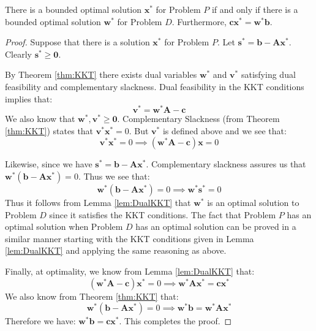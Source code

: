 \begin{lemma} There is a bounded optimal solution $\mathbf{x}^*$ for Problem $P$ if and only if there is a bounded optimal solution $\mathbf{w}^*$ for Problem $D$. Furthermore, $\mathbf{c}\mathbf{x}^* = \mathbf{w}^*\mathbf{b}$.
\label{lem:StrongDuality}
\end{lemma}
\begin{proof} Suppose that there is a solution $\mathbf{x}^*$ for Problem $P$. Let $\mathbf{s}^* = \mathbf{b} - \mathbf{A}\mathbf{x}^*$. Clearly $\mathbf{s}^* \geq \mathbf{0}$. 

By Theorem \ref{thm:KKT} there exists dual variables $\mathbf{w}^*$ and $\mathbf{v}^*$ satisfying dual feasibility and complementary slackness. Dual feasibility in the KKT conditions implies that:
\begin{equation}
\mathbf{v}^* = \mathbf{w}^*\mathbf{A} - \mathbf{c}
\end{equation}
We also know that $\mathbf{w}^*,\mathbf{v}^* \geq \mathbf{0}$. Complementary Slackness (from Theorem \ref{thm:KKT}) states that $\mathbf{v}^*\mathbf{x}^* = 0$. But $\mathbf{v}^*$ is defined above and we see that: 
\begin{equation}
\mathbf{v}^*\mathbf{x}^* = 0 \implies \left(\mathbf{w}^*\mathbf{A} - \mathbf{c}\right)\mathbf{x} = 0
\end{equation}

Likewise, since we have $\mathbf{s}^* = \mathbf{b} - \mathbf{A}\mathbf{x}^*$. Complementary slackness assures us that $\mathbf{w}^*\left(\mathbf{b} - \mathbf{A}\mathbf{x}^*\right) = 0$. Thus we see that:
\begin{equation}
\mathbf{w}^*\left(\mathbf{b} - \mathbf{A}\mathbf{x}^*\right) = 0 \implies \mathbf{w}^*\mathbf{s}^* = 0
\end{equation}
Thus it follows from Lemma  \ref{lem:DualKKT} that $\mathbf{w}^*$ is an optimal solution to Problem $D$ since it satisfies the KKT conditions. The fact that Problem $P$ has an optimal solution when Problem $D$ has an optimal solution can be proved in a similar manner starting with the KKT conditions given in Lemma \ref{lem:DualKKT} and applying the same reasoning as above. 

Finally, at optimality, we know from Lemma \ref{lem:DualKKT} that:
\begin{equation}
\left(\mathbf{w}^*\mathbf{A} - \mathbf{c}\right)\mathbf{x}^* = 0 \implies \mathbf{w}^*\mathbf{A}\mathbf{x}^* = \mathbf{c}\mathbf{x}^*
\end{equation}
We also know from Theorem \ref{thm:KKT} that:
\begin{equation}
\mathbf{w}^*\left(\mathbf{b} - \mathbf{A}\mathbf{x}^*\right) = 0\implies  \mathbf{w}^*\mathbf{b} = \mathbf{w}^*\mathbf{A}\mathbf{x}^*
\end{equation}
Therefore we have: $\mathbf{w}^*\mathbf{b} = \mathbf{c}\mathbf{x}^*$. This completes the proof.
\end{proof}

